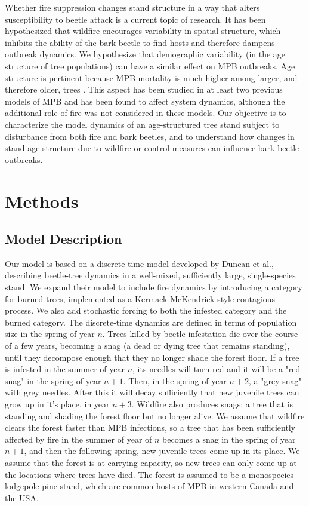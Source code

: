 Whether fire suppression changes stand structure in a way that alters susceptibility to beetle attack is a current topic of research.  It has been hypothesized that wildfire encourages variability in spatial structure\cite{seidl2016spatial}, which inhibits the ability of the bark beetle to find hosts and therefore dampens outbreak dynamics. We hypothesize that demographic variability (in the age structure of tree populations) can have a similar effect on MPB outbreaks. Age structure is pertinent because MPB mortality is much higher among larger, and therefore older, trees \cite{axelson2010changes,safranyik2003mountain}. This aspect has been studied in at least two previous models of MPB \cite{lewis2010structured,duncan2015model} and has been found to affect system dynamics, although the additional role of fire was not considered in these models. Our objective is to characterize the model dynamics of an age-structured tree stand subject to disturbance from both fire and bark beetles, and to understand how changes in stand age structure due to wildfire or control measures can influence bark beetle outbreaks. 


\section{Methods}

\subsection{Model Description}

Our model is based on a discrete-time model developed by Duncan et al.\cite{duncan2015model}, describing beetle-tree dynamics in a well-mixed, sufficiently large, single-species stand. We expand their model to include fire dynamics by introducing a category for burned trees, implemented as a Kermack-McKendrick-style contagious process\cite{edelstein1988mathematical}. We also add stochastic forcing to both the infested category and the burned category. The discrete-time dynamics are defined in terms of population size in the spring of year $n$. Trees killed by beetle infestation die over the course of a few years, becoming a snag (a dead or dying tree that remains standing), until they decompose enough that they no longer shade the forest floor. If a tree is infested in the summer of year $n$, its needles will turn red and it will be a "red snag" in the spring of year $n+1$. Then, in the spring of year $n+2$, a "grey snag" with grey needles. After this it will decay sufficiently that new juvenile trees can grow up in it's place, in year $n+3$. Wildfire also produces snags: a tree that is standing and shading the forest floor but no longer alive. We assume that wildfire clears the forest faster than MPB infections, so a tree that has been sufficiently affected by fire in the summer of year of $n$ becomes a snag in the spring of year $n+1$, and then the following spring, new juvenile trees come up in its place. We assume that the forest is at carrying capacity, so new trees can only come up at the locations where trees have died. The forest is assumed to be a monospecies lodgepole pine stand, which are common hosts of MPB in western Canada and the USA.


